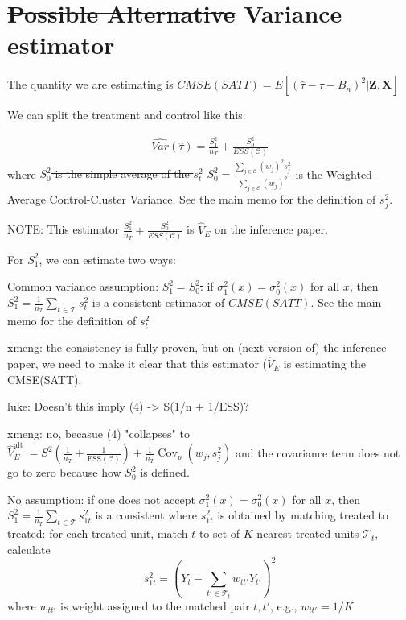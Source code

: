 \documentclass[11pt]{article}
\begin{document}
\section{\sout{Possible Alternative} Variance estimator}

The quantity we are estimating is $ CMSE(SATT) =  E[ (\hat{\tau} - \tau - B_n)^2 | \mathbf{Z}, \mathbf{X} ] $


We can split the treatment and control like this:

 \begin{align}
 \label{eq:plug-in-variance-estimator-naive}
     \widehat{Var}(\hat{\tau}) 
     = \frac{S^2_1}{n_T} + \frac{S^2_0}{ESS(\mathcal{C})}
 \end{align}
where \sout{$S^2_0$ is the simple average of the $s_t^2$}
$S^2_0 = \frac{\sum_{j \in \mathcal{C}} (w_j)^2 s_{j}^2}{\sum_{j \in \mathcal{C}} (w_j)^2}$ is the Weighted-Average Control-Cluster Variance. See the main memo for the definition of $s_j^2$.


NOTE: This estimator $\frac{S^2_1}{n_T} + \frac{S^2_0}{ESS(\mathcal{C})}$ is $\hat{V}_E$ on the inference paper.

For $S^2_1$, we can estimate two ways:

Common variance assumption: \sout{$S^2_1 = S^2_0$.} if $\sigma^2_1(x)= \sigma^2_0(x)$  for all $x$, then
$S^2_1 = \frac{1}{n_T} \sum_{t \in \mathcal{T}} s_{t}^2$ is a consistent estimator of $CMSE(SATT)$. See the main memo for the definition of $s_t^2$ 

xmeng: the consistency is fully proven, but on (next version of) the inference paper, we need to make it clear that this estimator ($\hat{V}_E$ is estimating the CMSE(SATT).

luke: Doesn't this imply (4) -> S(1/n + 1/ESS)?

xmeng: no, becasue (4) "collapses" to $\hat{V}_E^{\text {alt }}=S^2\left(\frac{1}{n_T}+\frac{1}{\mathrm{ESS}(\mathcal{C})}\right)+\frac{1}{n_T} \operatorname{Cov}_p\left(w_j, s_j^2\right)$ and the covariance term does not go to zero because how $S^2_0$ is defined. 

No assumption: if one does not accept $\sigma^2_1(x)= \sigma^2_0(x)$  for all $x$, then
$S^2_1 = \frac{1}{n_T} \sum_{t \in \mathcal{T}} s_{1t}^2$ is a consistent where $s^2_{1t}$ is obtained by matching treated to treated:
for each treated unit, match $t$ to set of $K$-nearest treated units $ \mathcal{T}_t$, calculate 
$$s^2_{1t} = (Y_{t} - \sum_{t' \in \mathcal{T}_t} w_{t t'} Y_{t'})^2$$
where $w_{t t'}$ is weight assigned to the matched pair $t, t'$, e.g., $w_{t t'}=1/K$
\end{document}
